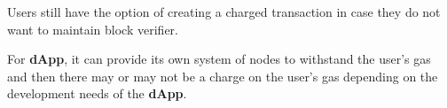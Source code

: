 \documentclass[12pt,oneside]{amsart}
\begin{document}
\begin{multicols}{2}
Users still have the option of creating a charged transaction in case they do not want to maintain block verifier.

For \textbf{{\small {dApp}}}, it can provide its own system of nodes to withstand the user's gas and then there may or may not be a charge on the user's gas depending on the development needs of the \textbf{{\small {dApp}}}.




\end{multicols}
\end{document}
